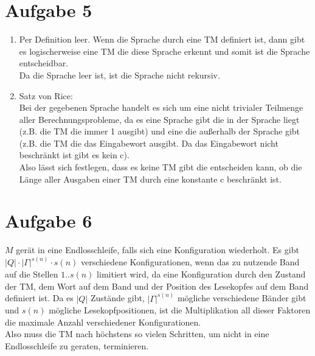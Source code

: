 \documentclass[a4paper,11pt]{scrartcl}
\begin{document}
	
	\section*{Aufgabe 5}
	\begin{enumerate}[label=\alph*)]
	\item 	Per Definition leer. Wenn die Sprache durch eine TM definiert ist, dann gibt es logischerweise eine TM die diese Sprache erkennt und somit ist die Sprache entscheidbar.\\
   			Da die Sprache leer ist, ist die Sprache nicht rekursiv.
   	\item 	Satz von Rice: \\
   			Bei der gegebenen Sprache handelt es sich um eine nicht trivialer Teilmenge aller Berechnungsprobleme, da es eine Sprache gibt die in der Sprache liegt (z.B. die TM die immer 1 ausgibt) und eine die außerhalb der Sprache gibt (z.B. die TM die das Eingabewort ausgibt. Da das Eingabewort nicht beschränkt ist gibt es kein c).\\
			Also lässt sich festlegen, dass es keine TM gibt die entscheiden kann, ob die Länge aller Ausgaben einer TM durch eine konstante c beschränkt ist.
	\end{enumerate}
	
	
	\section*{Aufgabe 6}
	$M$ gerät in eine Endlosschleife, falls sich eine Konfiguration wiederholt. Es gibt $\vert Q \vert \cdot {\vert \Gamma \vert }^{s(n)} \cdot s(n)$ verschiedene Konfigurationen, wenn das zu nutzende Band auf die Stellen $1..s(n)$ limitiert wird, da eine Konfiguration durch den Zustand der TM, dem Wort auf dem Band und der Position des Lesekopfes auf dem Band definiert ist. Da es $\vert Q \vert$ Zustände gibt, ${\vert \Gamma \vert}^{s(n)}$ mögliche verschiedene Bänder gibt und $s(n)$ mögliche Lesekopfpositionen, ist die Multiplikation all dieser Faktoren die maximale Anzahl verschiedener Konfigurationen.\\
	Also muss die TM nach höchstens so vielen Schritten, um nicht in eine Endlosschleife zu geraten, terminieren.
\end{document}
